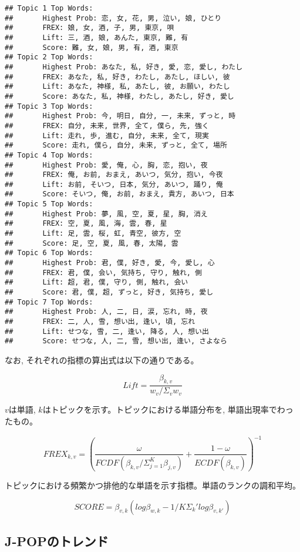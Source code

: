 \documentclass[
]{article}
\begin{document}
\begin{verbatim}
## Topic 1 Top Words:
##       Highest Prob: 恋, 女, 花, 男, 泣い, 娘, ひとり 
##       FREX: 娘, 女, 酒, 子, 男, 東京, 唄 
##       Lift: 三, 酒, 娘, あんた, 東京, 難, 有 
##       Score: 難, 女, 娘, 男, 有, 酒, 東京 
## Topic 2 Top Words:
##       Highest Prob: あなた, 私, 好き, 愛, 恋, 愛し, わたし 
##       FREX: あなた, 私, 好き, わたし, あたし, ほしい, 彼 
##       Lift: あなた, 神様, 私, あたし, 彼, お願い, わたし 
##       Score: あなた, 私, 神様, わたし, あたし, 好き, 愛し 
## Topic 3 Top Words:
##       Highest Prob: 今, 明日, 自分, 一, 未来, ずっと, 時 
##       FREX: 自分, 未来, 世界, 全て, 僕ら, 先, 強く 
##       Lift: 走れ, 歩, 進む, 自分, 未来, 全て, 現実 
##       Score: 走れ, 僕ら, 自分, 未来, ずっと, 全て, 場所 
## Topic 4 Top Words:
##       Highest Prob: 愛, 俺, 心, 胸, 恋, 抱い, 夜 
##       FREX: 俺, お前, おまえ, あいつ, 気分, 抱い, 今夜 
##       Lift: お前, そいつ, 日本, 気分, あいつ, 踊り, 俺 
##       Score: そいつ, 俺, お前, おまえ, 貴方, あいつ, 日本 
## Topic 5 Top Words:
##       Highest Prob: 夢, 風, 空, 夏, 星, 胸, 消え 
##       FREX: 空, 夏, 風, 海, 雲, 春, 星 
##       Lift: 足, 雲, 桜, 虹, 青空, 彼方, 空 
##       Score: 足, 空, 夏, 風, 春, 太陽, 雲 
## Topic 6 Top Words:
##       Highest Prob: 君, 僕, 好き, 愛, 今, 愛し, 心 
##       FREX: 君, 僕, 会い, 気持ち, 守り, 触れ, 側 
##       Lift: 超, 君, 僕, 守り, 側, 触れ, 会い 
##       Score: 君, 僕, 超, ずっと, 好き, 気持ち, 愛し 
## Topic 7 Top Words:
##       Highest Prob: 人, 二, 日, 涙, 忘れ, 時, 夜 
##       FREX: 二, 人, 雪, 想い出, 逢い, 頃, 忘れ 
##       Lift: せつな, 雪, 二, 逢い, 降る, 人, 想い出 
##       Score: せつな, 人, 二, 雪, 想い出, 逢い, さよなら
\end{verbatim}

なお, それぞれの指標の算出式は以下の通りである。

\[Lift= \frac{\beta_{k,v}}{w_v/\Sigma_v w_v}\]

\(v\)は単語, \(k\)はトピックを示す。トピックにおける単語分布を,
単語出現率でわったもの。

\[FREX_{k,v}=(\frac{\omega}{FCDF(\beta_{k,v}/\Sigma_{j=1}^K \beta_{j,v})}+\frac{1-\omega}{ECDF(\beta_{k,v})})^{-1}\]

トピックにおける頻繁かつ排他的な単語を示す指標。単語のランクの調和平均。

\[SCORE=\beta_{v,k}(log\beta_{w,k}-1/K\Sigma_k\prime log\beta_{v,k\prime})\]

\hypertarget{j-popux306eux30c8ux30ecux30f3ux30c9}{%
\subsection{J-POPのトレンド}\label{j-popux306eux30c8ux30ecux30f3ux30c9}}
\end{document}
